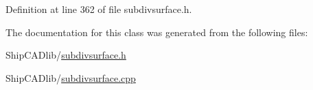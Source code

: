Definition at line 362 of file subdivsurface.\-h.



The documentation for this class was generated from the following files\-:\begin{DoxyCompactItemize}
\item 
Ship\-C\-A\-Dlib/\hyperlink{subdivsurface_8h}{subdivsurface.\-h}\item 
Ship\-C\-A\-Dlib/\hyperlink{subdivsurface_8cpp}{subdivsurface.\-cpp}\end{DoxyCompactItemize}
